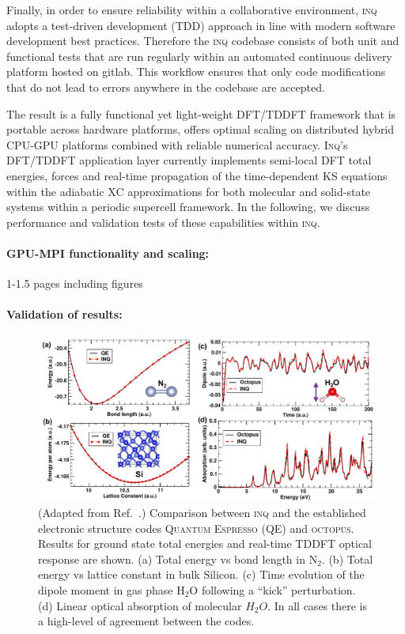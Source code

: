 Finally, in order to ensure reliability within a collaborative environment, \textsc{inq} adopts a test-driven development (TDD) approach in line with modern software development best practices. 
Therefore the \textsc{inq} codebase consists of both unit and functional tests that are run regularly within an automated continuous delivery platform hosted on gitlab. This workflow ensures that only code modifications that do not lead to errors anywhere in the codebase are accepted.

The result is a fully functional yet light-weight DFT/TDDFT framework that is portable across hardware platforms, offers optimal scaling on distributed hybrid CPU-GPU platforms combined with reliable numerical accuracy. 
\textsc{Inq}'s DFT/TDDFT application layer currently implements semi-local DFT total energies, forces and real-time propagation of the time-dependent KS equations within the adiabatic XC approximations for both molecular and solid-state systems within a periodic supercell framework. 
In the following, we discuss performance and validation tests of these capabilities within \textsc{inq}. 

\paragraph{GPU-MPI functionality and scaling:}
1-1.5 pages including figures

\paragraph{Validation of results:}
\begin{figure}[h]
	\centering
	\includegraphics[width=1.0\linewidth]{figures/Results-Fig.pdf}
	\caption{
		(Adapted from Ref.~\cite{Andrade2021}.) 
		Comparison between \textsc{inq} and the established electronic structure codes \textsc{Quantum Espresso} (QE) and \textsc{octopus}.
Results for ground state total energies and real-time TDDFT optical response are shown. 
		(a) Total energy vs bond length in \(\mathrm{N_2}\).
		(b) Total energy vs lattice constant in bulk Silicon. 
		(c) Time evolution of the dipole moment in gas phase \(\mathrm{H_2O}\) following a ``kick'' perturbation. 
		(d) Linear optical absorption of molecular \(H_2O\). 
		In all cases there is a high-level of agreement between the codes.
	}
	\label{fig:inq_results}
\end{figure}

